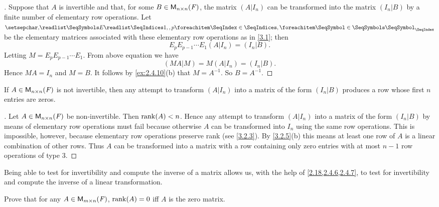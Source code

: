 \begin{proof}[]
  Suppose that \(A\) is invertible and that, for some \(B \in \mathsf{M}_{{n} \times n}({\mathit{F}})\), the matrix \((A | I_n)\) can be transformed into the matrix \((I_n | B)\) by a finite number of elementary row operations.
  Let \(\seq{E}{1,,p}\) be the elementary matrices associated with these elementary row operations as in \cref{3.1};
  then
  \[
    E_p E_{p - 1} \cdots E_1 (A | I_n) = (I_n | B).
  \]
  Letting \(M = E_p E_{p - 1} \cdots E_1\).
  From above equation we have
  \[
    (MA | M) = M (A | I_n) = (I_n | B).
  \]
  Hence \(MA = I_n\) and \(M = B\).
  It follows by \cref{ex:2.4.10}(b) that \(M = A^{-1}\).
  So \(B = A^{-1}\).
\end{proof}

\begin{cor}\label{3.2.10}
  If \(A \in \mathsf{M}_{{n} \times n}({\mathit{F}})\) is not invertible, then any attempt to transform \((A | I_n)\) into a matrix of the form \((I_n | B)\) produces a row whose first \(n\) entries are zeros.
\end{cor}

\begin{proof}[]
  Let \(A \in \mathsf{M}_{{n} \times n}({\mathit{F}})\) be non-invertible.
  Then \(\rk{A} < n\).
  Hence any attempt to transform \((A | I_n)\) into a matrix of the form \((I_n | B)\) by means of elementary row operations must fail because otherwise \(A\) can be transformed into \(I_n\) using the same row operations.
  This is impossible, however, because elementary row operations preserve rank
  (see \cref{3.2.3}).
  By \cref{3.2.5}(b) this means at least one row of \(A\) is a linear combination of other rows.
  Thus \(A\) can be transformed into a matrix with a row containing only zero entries with at most \(n - 1\) row operations of type 3.
\end{proof}

\begin{note}
  Being able to test for invertibility and compute the inverse of a matrix allows us, with the help of \cref{2.18,2.4.6,2.4.7}, to test for invertibility and compute the inverse of a linear transformation.
\end{note}

\exercisesection

\setcounter{ex}{2}
\begin{ex}\label{ex:3.2.3}
  Prove that for any \(A \in \mathsf{M}_{{m} \times n}({\mathit{F}})\), \(\rk{A} = 0\) iff \(A\) is the zero matrix.
\end{ex}

